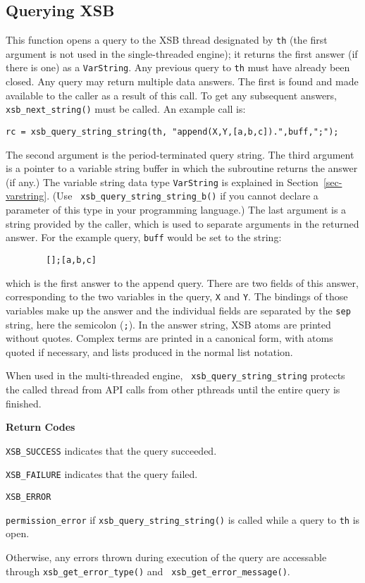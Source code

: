 \subsection{Querying XSB}

\begin{description}
  
%
This function opens a query to the XSB thread designated by {\tt th}
(the first argument is not used in the single-threaded engine); it
returns the first answer (if there is one) as a {\tt VarString}.  Any
previous query to {\tt th} must have already been closed.  Any query
may return multiple data answers.  The first is found and made
available to the caller as a result of this call.  To get any
subsequent answers, {\tt xsb\_next\_string()} must be called.  An
example call is:
\begin{verbatim}
rc = xsb_query_string_string(th, "append(X,Y,[a,b,c]).",buff,";");
\end{verbatim}
The second argument is the period-terminated query string.  The third
argument is a pointer to a variable string buffer in which the
subroutine returns the answer (if any.) The variable string data type
{\tt VarString} is explained in Section~\ref{sec-varstring}. (Use {\tt
  xsb\_query\_string\_string\_b()} if you cannot declare a parameter
of this type in your programming language.)  The last argument is a
string provided by the caller, which is used to separate arguments in
the returned answer.  For the example query, {\tt buff} would be set
to the string:
\begin{verbatim}
        [];[a,b,c]
\end{verbatim}
which is the first answer to the append query.  There are two fields
of this answer, corresponding to the two variables in the query,
\verb|X| and \verb|Y|.  The bindings of those variables make up the
answer and the individual fields are separated by the \verb|sep|
string, here the semicolon (\verb|;|).  In the answer string, XSB
atoms are printed without quotes.  Complex terms are printed in a
canonical form, with atoms quoted if necessary, and lists produced in
the normal list notation.

When used in the multi-threaded engine, {\tt
  xsb\_query\_string\_string} protects the called thread from API
calls from other pthreads until the entire query is finished.

{\bf Return Codes}  
\bi
\item {\tt XSB\_SUCCESS} indicates that the query succeeded.
%
\item {\tt XSB\_FAILURE} indicates that the query failed.
%
\item {\tt XSB\_ERROR} 
\bi
\item {\tt permission\_error} if {\tt xsb\_query\_string\_string()} is
  called while a query to {\tt th} is open.
%
\item Otherwise, any errors thrown during execution of the query are
  accessable through {\tt xsb\_get\_error\_type()} and {\tt
    xsb\_get\_error\_message()}.  
\ei 
\ei


\end{description}

